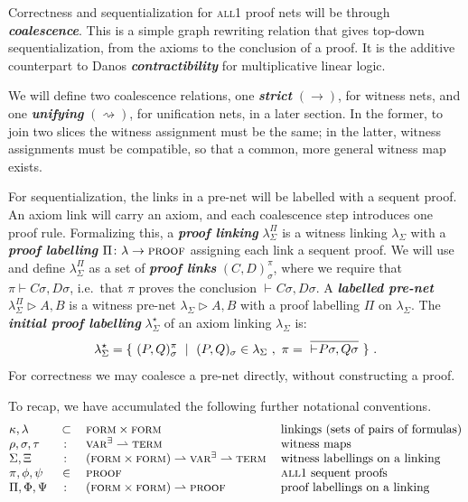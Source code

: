 \documentclass[UKenglish]{lipics-v2016}
\theoremstyle{plain}
\newcommand\defn[1]{\textit{\textbf{#1}}}
\newcommand\varE{\textsc{var}^\exists}
\newcommand\terms{\textsc{term}}
\newcommand\form{\textsc{form}}
\newcommand\proofs{\textsc{proof}}
\newcommand\all{\textsc{all}}
\newcommand\+{+}
\renewcommand\*{\times}
\newcommand\seq[3][]{{\vdash_{#1}}#2,#3}
\newcommand\prf[3]{#1\vdash\!#2,#3}
\newcommand\net[3]{#1\triangleright #2,#3}
\newcommand\link[3][\sigma]{(#2,#3)_{#1}}
\newcommand\scoal{\rightarrow} %
\newcommand\ucoal{\rightsquigarrow}
\begin{document}
Correctness and sequentialization for \all1 proof nets will be through \defn{coalescence}. This is a simple graph rewriting relation that gives top-down sequentialization, from the axioms to the conclusion of a proof. It is the additive counterpart to Danos \defn{contractibility} for multiplicative linear logic. 

We will define two coalescence relations, one \defn{strict} $(\scoal)$, for witness nets, and one \defn{unifying} $(\ucoal)$, for unification nets, in a later section. In the former, to join two slices the witness assignment must be the same; in the latter, witness assignments must be compatible, so that a common, more general witness map exists. 

For sequentialization, the links in a pre-net will be labelled with a sequent proof. An axiom link will carry an axiom, and each coalescence step introduces one proof rule. Formalizing this, a \defn{proof linking} $\lambda_\Sigma^\Pi$ is a witness linking $\lambda_\Sigma$ with a \defn{proof labelling} $\Pi\colon \lambda\to\proofs$ assigning each link a sequent proof. We will use and define $\lambda_\Sigma^\Pi$ as a set of \defn{proof links} $\link CD^\pi$, where we require that $\prf\pi{C\sigma}{D\sigma}$, i.e.\ that $\pi$ proves the conclusion $\seq{C\sigma}{D\sigma}$. A \defn{labelled pre-net} $\net{\lambda_\Sigma^\Pi}AB$ is a witness pre-net $\net{\lambda_\Sigma}AB$ with a proof labelling $\Pi$ on $\lambda_\Sigma$. The \defn{initial proof labelling} $\lambda_\Sigma^\star$ of an axiom linking $\lambda_\Sigma$ is:
\[
	\lambda_\Sigma^\star = \{~\link PQ^\pi~\mid~\link PQ\in\lambda_\Sigma~,~\pi=~\infer{\seq{P\sigma}{Q\sigma}}{}~\}~.
\]
For correctness we may coalesce a pre-net directly, without constructing a proof. 

To recap, we have accumulated the following further notational conventions.
%
\[
\begin{tabular}{@{}lcll@{}}
	$\kappa,\lambda$ 	& $\subset$ & $\form\times\form$ 	& linkings (sets of pairs of formulas)\\
	$\rho,\sigma,\tau$	& $\colon$  & $\varE\rightharpoonup\terms$ & witness maps\\
	$\Sigma,\Xi$		& $\colon$  & $(\form\times\form)\rightharpoonup\varE\rightharpoonup\terms$		& witness labellings on a linking \\
	$\pi,\phi,\psi$		& $\in$ & $\proofs$ & \all1 sequent proofs\\
	$\Pi,\Phi,\Psi$		& $\colon$  & $(\form\times\form)\rightharpoonup\proofs$		& proof labellings on a linking
\end{tabular}
\]
\end{document}

